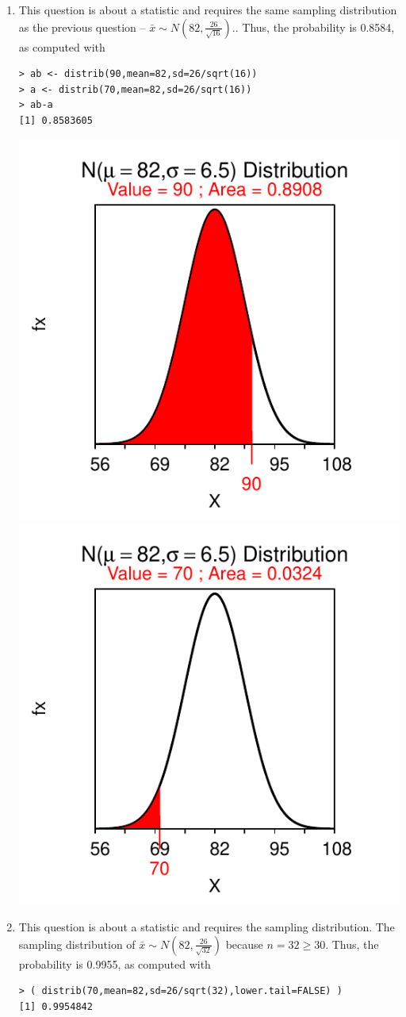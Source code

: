 \documentclass[10pt,openany]{book}\usepackage[]{graphicx}\usepackage[]{color}
\makeatletter
\newenvironment{kframe}{%
 \def\at@end@of@kframe{}%
 \ifinner\ifhmode%
  \def\at@end@of@kframe{\end{minipage}}%
  \begin{minipage}{\columnwidth}%
 \fi\fi%
 \def\FrameCommand##1{\hskip\@totalleftmargin \hskip-\fboxsep
 \colorbox{shadecolor}{##1}\hskip-\fboxsep
     \hskip-\linewidth \hskip-\@totalleftmargin \hskip\columnwidth}%
 \MakeFramed {\advance\hsize-\width
   \@totalleftmargin\z@ \linewidth\hsize
   \@setminipage}}%
 {\par\unskip\endMakeFramed%
 \at@end@of@kframe}
\newenvironment{knitrout}{}{} %
\makeatother
\begin{document}
\begin{itemize}
\begin{enumerate}
\begin{knitrout}
{}



\end{knitrout}
       \item This question is about a statistic and requires the same sampling distribution as the previous question --  $\bar{x}\sim N(82,\frac{26}{\sqrt{16}})$..  Thus, the probability is 0.8584, as computed with
\begin{knitrout}
\color{fgcolor}\begin{kframe}
\begin{verbatim}
> ab <- distrib(90,mean=82,sd=26/sqrt(16))
> a <- distrib(70,mean=82,sd=26/sqrt(16))
> ab-a
[1] 0.8583605
\end{verbatim}
\end{kframe}

{\centering \includegraphics[width=.4\linewidth]{Figs/unnamed-chunk-310-1} 
\includegraphics[width=.4\linewidth]{Figs/unnamed-chunk-310-2} 

}



\end{knitrout}
       \item This question is about a statistic and requires the sampling distribution.  The sampling distribution of $\bar{x}\sim N(82,\frac{26}{\sqrt{32}})$ because $n=32 \geq 30$.  Thus, the probability is 0.9955, as computed with
\begin{knitrout}
\color{fgcolor}\begin{kframe}
\begin{verbatim}
> ( distrib(70,mean=82,sd=26/sqrt(32),lower.tail=FALSE) )
[1] 0.9954842
\end{verbatim}
\end{kframe}


\end{knitrout}
\end{enumerate}
\end{itemize}
\end{document}
